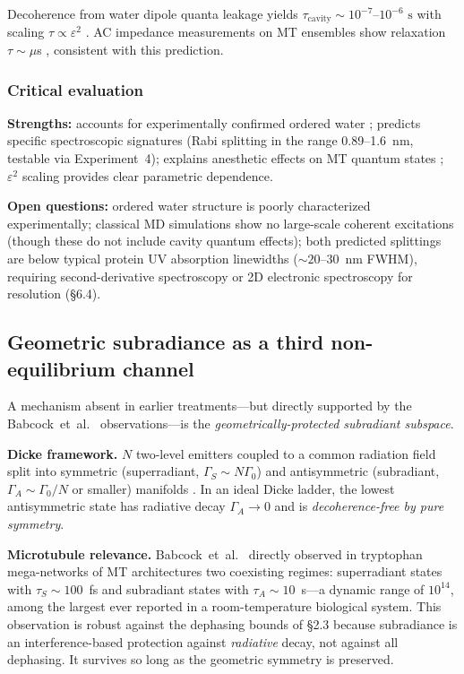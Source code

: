 \documentclass[twocolumn,10pt]{article}
\begin{document}
Decoherence from water dipole quanta leakage yields
$\tau_{\text{cavity}} \sim 10^{-7}\text{--}10^{-6}\text{~s}$ with scaling
$\tau \propto \varepsilon^2$ \cite{Mavromatos2025}. AC impedance
measurements on MT ensembles show relaxation $\tau \sim \mu$s
\cite{Santelices2017}, consistent with this prediction.


\subsubsection{Critical evaluation}

\textbf{Strengths:} accounts for experimentally confirmed ordered water
\cite{Sahu2013}; predicts specific spectroscopic signatures (Rabi splitting
in the range 0.89--1.6~nm, testable via Experiment~4); explains anesthetic
effects on MT quantum states \cite{Kalra2023}; $\varepsilon^2$ scaling
provides clear parametric dependence.

\textbf{Open questions:} ordered water structure is poorly characterized
experimentally; classical MD simulations \cite{Moix2017} show no
large-scale coherent excitations (though these do not include cavity
quantum effects); both predicted splittings are below typical protein UV
absorption linewidths ($\sim 20\text{--}30$~nm FWHM), requiring
second-derivative spectroscopy or 2D electronic spectroscopy for resolution
(\S 6.4).


\subsection{Geometric subradiance as a third non-equilibrium channel}
\label{sec:subradiance}

A mechanism absent in earlier treatments---but directly supported by the
Babcock~et~al.\ \cite{Babcock2024} observations---is the
\emph{geometrically-protected subradiant subspace}.

\textbf{Dicke framework.} $N$ two-level emitters coupled to a common
radiation field split into symmetric (superradiant, $\Gamma_S\sim N\Gamma_0$)
and antisymmetric (subradiant, $\Gamma_A\sim \Gamma_0/N$ or smaller)
manifolds \cite{Dicke1954,Gross1982}. In an ideal Dicke ladder, the lowest
antisymmetric state has radiative decay $\Gamma_A\to 0$ and is
\emph{decoherence-free by pure symmetry}.

\textbf{Microtubule relevance.} Babcock~et~al.\ \cite{Babcock2024} directly
observed in tryptophan mega-networks of MT architectures two coexisting
regimes: superradiant states with $\tau_S\sim 100$~fs and subradiant
states with $\tau_A\sim 10$~s---a dynamic range of $10^{14}$, among the
largest ever reported in a room-temperature biological system. This
observation is robust against the dephasing bounds of \S 2.3 because
subradiance is an interference-based protection against
\emph{radiative} decay, not against all dephasing. It survives so long as
the geometric symmetry is preserved.
\end{document}
